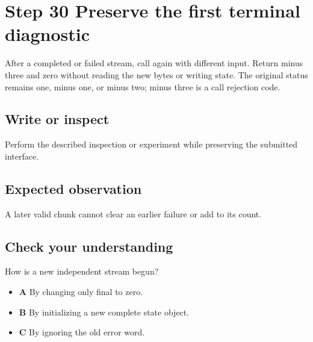 \section{Step 30 Preserve the first terminal diagnostic}\label{utf8-s30}

After a completed or failed stream, call again with different input. Return minus three and zero without reading the new bytes or writing state. The original status remains one, minus one, or minus two; minus three is a call rejection code.

\subsection{Write or inspect}
Perform the described inspection or experiment while preserving the submitted interface.

\subsection{Expected observation}
A later valid chunk cannot clear an earlier failure or add to its count.

\subsection{Check your understanding}
How is a new independent stream begun?

\begin{itemize}
  \item \textbf{A} By changing only final to zero.
  \item \textbf{B} By initializing a new complete state object.
  \item \textbf{C} By ignoring the old error word.
\end{itemize}
